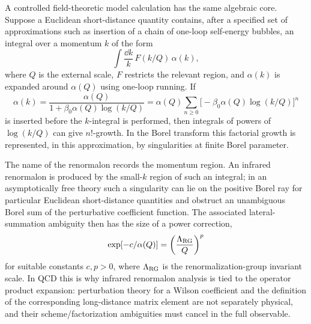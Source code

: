 A controlled field-theoretic model calculation has the same algebraic core.
Suppose a Euclidean short-distance quantity contains, after a specified set
of approximations such as insertion of a chain of one-loop self-energy
bubbles, an integral over a momentum \(k\) of the form
\[
  \int \frac{\dd k}{k}\,F(k/Q)\,\alpha(k),
\]
where \(Q\) is the external scale, \(F\) restricts the relevant region, and
\(\alpha(k)\) is expanded around \(\alpha(Q)\) using one-loop running.  If
\[
  \alpha(k)
  =
  \frac{\alpha(Q)}
       {1+\beta_0\alpha(Q)\log(k/Q)}
  =
  \alpha(Q)\sum_{n\ge0}
  \bigl[-\beta_0\alpha(Q)\log(k/Q)\bigr]^n
\]
is inserted before the \(k\)-integral is performed, then integrals of powers of
\(\log(k/Q)\) can give \(n!\)-growth.  In the Borel transform this factorial
growth is represented, in this approximation, by singularities at finite Borel
parameter.

The name of the renormalon records the momentum region.  An infrared
renormalon is produced by the small-\(k\) region of such an integral; in an
asymptotically free theory such a singularity can lie on the positive Borel
ray for particular Euclidean short-distance quantities and obstruct an
unambiguous Borel sum of the perturbative coefficient function.  The associated
lateral-summation ambiguity then has the size of a power correction,
\[
  \exp[-c/\alpha(Q)]
  =
  \left(\frac{\Lambda_{\rm RG}}{Q}\right)^p
\]
for suitable constants \(c,p>0\), where \(\Lambda_{\rm RG}\) is the
renormalization-group invariant scale.  In QCD this is why infrared
renormalon analysis is tied to the operator product expansion: perturbation
theory for a Wilson coefficient and the definition of the corresponding
long-distance matrix element are not separately physical, and their
scheme/factorization ambiguities must cancel in the full observable.

